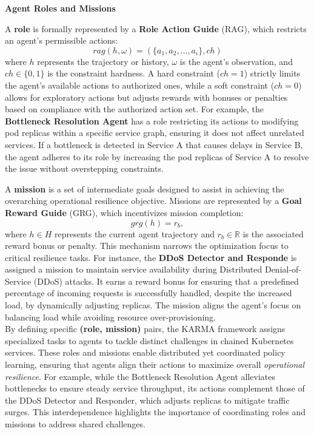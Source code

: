 \documentclass[conference]{IEEEtran}
\begin{document}
\noindent \textbf{Agent Roles and Missions}

A \textbf{role} is formally represented by a \textbf{Role Action Guide} (RAG), which restricts an agent's permissible actions:
$$
rag(h, \omega) = (\{a_1, a_2, \dots, a_i\}, ch)
$$
where $h$ represents the trajectory or history, \(\omega\) is the agent's observation, and \(ch \in \{0,1\}\) is the constraint hardness. A hard constraint (\(ch = 1\)) strictly limits the agent's available actions to authorized ones, while a soft constraint (\(ch = 0\)) allows for exploratory actions but adjusts rewards with bonuses or penalties based on compliance with the authorized action set. For example, the \textbf{Bottleneck Resolution Agent} has a role restricting its actions to modifying pod replicas within a specific service graph, ensuring it does not affect unrelated services. If a bottleneck is detected in Service A that causes delays in Service B, the agent adheres to its role by increasing the pod replicas of Service A to resolve the issue without overstepping constraints.

A \textbf{mission} is a set of intermediate goals designed to assist in achieving the overarching operational resilience objective. Missions are represented by a \textbf{Goal Reward Guide} (GRG), which incentivizes mission completion:
$$
grg(h) = r_b,
$$
where \(h \in H\) represents the current agent trajectory and \(r_b \in \mathbb{R}\) is the associated reward bonus or penalty. This mechanism narrows the optimization focus to critical resilience tasks. For instance, the \textbf{DDoS Detector and Responde} is assigned a mission to maintain service availability during Distributed Denial-of-Service (DDoS) attacks. It earns a reward bonus for ensuring that a predefined percentage of incoming requests is successfully handled, despite the increased load, by dynamically adjusting replicas. The mission aligns the agent's focus on balancing load while avoiding resource over-provisioning.\\

By defining specific \textbf{(role, mission)} pairs, the KARMA framework assigns specialized tasks to agents to tackle distinct challenges in chained Kubernetes services. These roles and missions enable distributed yet coordinated policy learning, ensuring that agents align their actions to maximize overall \textit{operational resilience}. For example, while the Bottleneck Resolution Agent alleviates bottlenecks to ensure steady service throughput, its actions complement those of the DDoS Detector and Responder, which adjusts replicas to mitigate traffic surges. This interdependence highlights the importance of coordinating roles and missions to address shared challenges.
\end{document}
